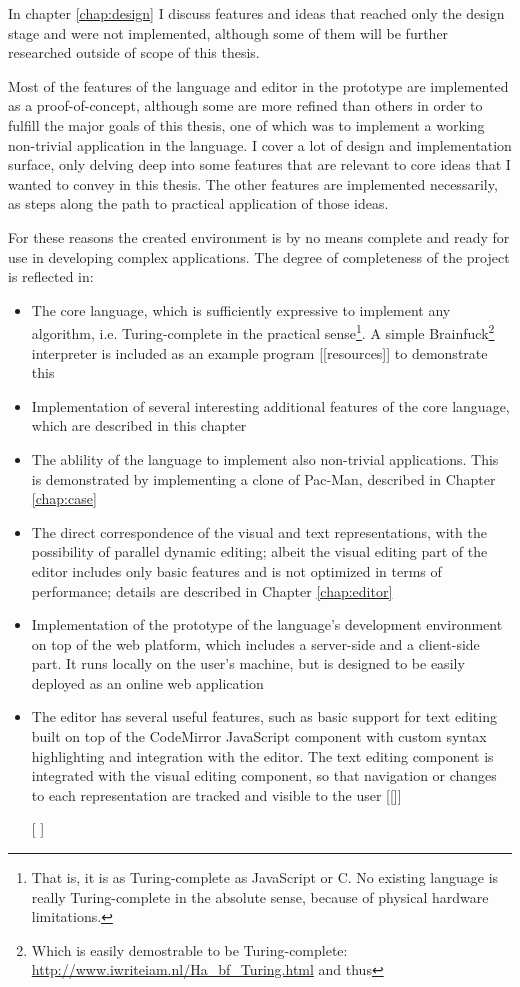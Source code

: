 In chapter \ref{chap:design} I discuss features and ideas that reached only the design stage and were not implemented, although some of them will be further researched outside of scope of this thesis.

Most of the features of the language and editor in the prototype are implemented as a proof-of-concept, although some are more refined than others in order to fulfill the major goals of this thesis, one of which was to implement a working non-trivial application in the language. I cover a lot of design and implementation surface, only delving deep into some features that are relevant to core ideas that I wanted to convey in this thesis. The other features are implemented necessarily, as steps along the path to practical application of those ideas.

For these reasons the created environment is by no means complete and ready for use in developing complex applications. The degree of completeness of the project is reflected in:
\begin{itemize}
    \item The core language, which is sufficiently expressive to implement any algorithm, i.e. Turing-complete in the practical sense\footnote{That is, it is as Turing-complete as JavaScript or C. No existing language is really Turing-complete in the absolute sense, because of physical hardware limitations.}. A simple Brainfuck\footnote{Which is easily demostrable to be Turing-complete: \url{http://www.iwriteiam.nl/Ha_bf_Turing.html} and thus} interpreter is included as an example program [[resources]] to demonstrate this
    \item Implementation of several interesting additional features of the core language, which are described in this chapter
    \item The ablility of the language to implement also non-trivial applications. This is demonstrated by implementing a clone of Pac-Man, described in Chapter \ref{chap:case}
    \item The direct correspondence of the visual and text representations, with the possibility of parallel dynamic editing; albeit the visual editing part of the editor includes only basic features and is not optimized in terms of performance; details are described in Chapter \ref{chap:editor}
    \item Implementation of the prototype of the language's development environment on top of the web platform, which includes a server-side and a client-side part. It runs locally on the user's machine, but is designed to be easily deployed as an online web application
    \item The editor has several useful features, such as basic support for text editing built on top of the CodeMirror JavaScript component with custom syntax highlighting and integration with the editor. The text editing component is integrated with the visual editing component, so that navigation or changes to each representation are tracked and visible to the user [[]]
    \item [[]]
\end{itemize}

